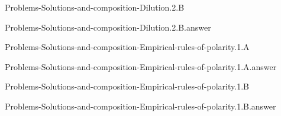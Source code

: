 \documentclass[main.tex]{subfiles}
\newcommand\chapterlabel{}
\begin{document}
\renewcommand\chapterlabel{Ch-electrolytes}
\begin{question}[ID=\the\value{numA}]
{Problems-Solutions-and-composition-Dilution.2.B}
\end{question}
   \begin{Form}
   \TextField[multiline,backgroundcolor=gray!20,borderwidth=0,width=0.43\textwidth  ,height=115pt, name=\the\value{numA}]  { }\end{Form}
\begin{solution}
{Problems-Solutions-and-composition-Dilution.2.B.answer}
\hspace{0.1cm}
\end{solution}


\renewcommand\chapterlabel{Ch-electrolytes}
\begin{question}[ID=\the\value{numA}]
{Problems-Solutions-and-composition-Empirical-rules-of-polarity.1.A}
\end{question}
   \begin{Form}
   \TextField[multiline,backgroundcolor=gray!20,borderwidth=0,width=0.43\textwidth  ,height=115pt, name=\the\value{numA}]  { }\end{Form}
\begin{solution}
{Problems-Solutions-and-composition-Empirical-rules-of-polarity.1.A.answer}
\hspace{0.1cm}
\end{solution}


\renewcommand\chapterlabel{Ch-electrolytes}
\begin{question}[ID=\the\value{numA}]
{Problems-Solutions-and-composition-Empirical-rules-of-polarity.1.B}
\end{question}
   \begin{Form}
   \TextField[multiline,backgroundcolor=gray!20,borderwidth=0,width=0.43\textwidth  ,height=115pt, name=\the\value{numA}]  { }\end{Form}
\begin{solution}
{Problems-Solutions-and-composition-Empirical-rules-of-polarity.1.B.answer}
\hspace{0.1cm}
\end{solution}
\end{document}
